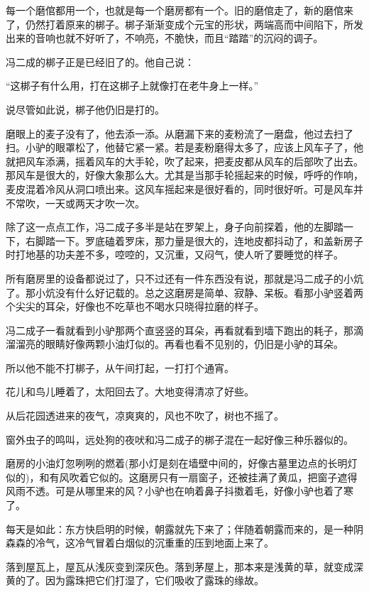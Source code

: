 \par 每一个磨倌都用一个，也就是每一个磨房都有一个。旧的磨倌走了，新的磨倌来了，仍然打着原来的梆子。梆子渐渐变成个元宝的形状，两端高而中间陷下，所发出来的音响也就不好听了，不响亮，不脆快，而且“踏踏”的沉闷的调子。
\par 冯二成的梆子正是已经旧了的。他自己说：
\par “这梆子有什么用，打在这梆子上就像打在老牛身上一样。”
\par 说尽管如此说，梆子他仍旧是打的。
\par 磨眼上的麦子没有了，他去添一添。从磨漏下来的麦粉流了一磨盘，他过去扫了扫。小驴的眼罩松了，他替它紧一紧。若是麦粉磨得太多了，应该上风车子了，他就把风车添满，摇着风车的大手轮，吹了起来，把麦皮都从风车的后部吹了出去。那风车是很大的，好像大象那么大。尤其是当那手轮摇起来的时候，呼呼的作响，麦皮混着冷风从洞口喷出来。这风车摇起来是很好看的，同时很好听。可是风车并不常吹，一天或两天才吹一次。
\par 除了这一点点工作，冯二成子多半是站在罗架上，身子向前探着，他的左脚踏一下，右脚踏一下。罗底磕着罗床，那力量是很大的，连地皮都抖动了，和盖新房子时打地基的功夫差不多，啌啌的，又沉重，又闷气，使人听了要睡觉的样子。
\par 所有磨房里的设备都说过了，只不过还有一件东西没有说，那就是冯二成子的小炕了。那小炕没有什么好记载的。总之这磨房是简单、寂静、呆板。看那小驴竖着两个尖尖的耳朵，好像也不吃草也不喝水只晓得拉磨的样子。
\par 冯二成子一看就看到小驴那两个直竖竖的耳朵，再看就看到墙下跑出的耗子，那滴溜溜亮的眼睛好像两颗小油灯似的。再看也看不见别的，仍旧是小驴的耳朵。
\par 所以他不能不打梆子，从午间打起，一打打个通宵。
\par 花儿和鸟儿睡着了，太阳回去了。大地变得清凉了好些。
\par 从后花园透进来的夜气，凉爽爽的，风也不吹了，树也不摇了。
\par 窗外虫子的鸣叫，远处狗的夜吠和冯二成子的梆子混在一起好像三种乐器似的。
\par 磨房的小油灯忽咧咧的燃着(那小灯是刻在墙壁中间的，好像古墓里边点的长明灯似的)，和有风吹着它似的。这磨房只有一扇窗子，还被挂满了黄瓜，把窗子遮得风雨不透。可是从哪里来的风？小驴也在响着鼻子抖擞着毛，好像小驴也着了寒了。
\par 每天是如此：东方快启明的时候，朝露就先下来了；伴随着朝露而来的，是一种阴森森的冷气，这冷气冒着白烟似的沉重重的压到地面上来了。
\par 落到屋瓦上，屋瓦从浅灰变到深灰色。落到茅屋上，那本来是浅黄的草，就变成深黄的了。因为露珠把它们打湿了，它们吸收了露珠的缘故。
